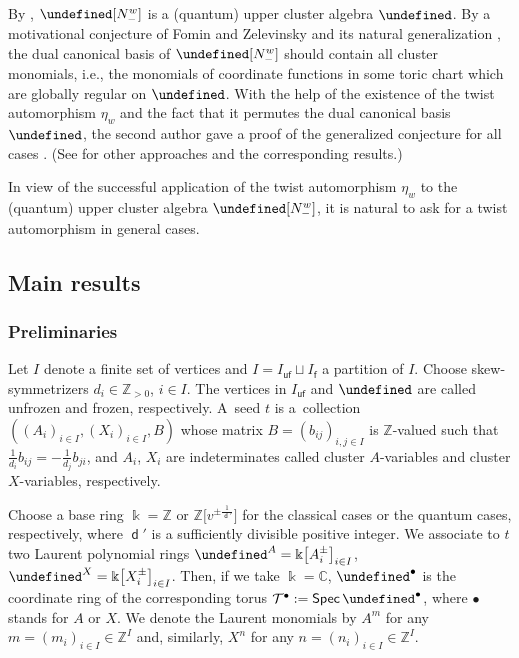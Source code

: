 \documentclass[10pt,a4paper]{amsart}
\newcommand{\kk}{\Bbbk}
\newcommand{\Z}{\mathbb{Z}}
\newcommand{\C}{\mathbb{C}}
\newcommand{\opname}[1]{\operatorname{\mathsf{#1}}}
\newcommand{\Spec}{\operatorname{\mathsf{Spec}}}
\newcommand{\cT}{{\mathcal T}}
\newcommand{\diag}{{\delta}}
\renewcommand{\diag}{{d}}
\newcommand{\fv}{\opname{f}}
\newcommand{\ufv}{\opname{uf}}
\let\dCan\undefined
\let\Ifv\undefined
\let\upClAlg\undefined
\let\AVar\undefined
\let\LP\undefined
\let\qO\undefined
\newcommand{\dCan}{\opname{B}^*}
\newcommand{\Ifv}{I_{\fv}}
\newcommand{\upClAlg}{\mathcal{U}^A}
\newcommand{\AVar}{\mathbb{A}}
\newcommand{\LP}{{\mathcal{LP}}}
\renewcommand{\diag}{\opname{d}'}
\newcommand{\qO}{{\opname{A_q}}}
\numberwithin{equation}{section}
\begin{document}
By \cite{GeissLeclercSchroeer10,GeissLeclercSchroeer11,GY13,goodearl2020integral},
$\qO[N_{-}^{w}]$ is a (quantum) upper cluster algebra $\upClAlg$.
By a motivational conjecture of Fomin and Zelevinsky \cite{FominZelevinsky02}
and its natural generalization \cite{Kimura10}, the dual canonical
basis of $\qO[N_{-}^{w}]$ should contain all cluster monomials, i.e.,
the monomials of coordinate functions in some toric chart which are globally regular
on $\AVar$. With the help of the existence of the twist automorphism
$\eta_{w}$ and the fact that it permutes the dual canonical basis
$\dCan$, the second author gave a proof of the generalized conjecture
for all cases \cite{qin2020dual}. (See \cite{Kang2018,mcnamara2021cluster,qin2017triangular} for other approaches
and the corresponding results.)

In view of the successful application of the twist automorphism $\eta_{w}$
to the (quantum) upper cluster algebra $\qO[N_{-}^{w}]$, it is natural
to ask for a twist automorphism in general cases.

\subsection{Main results}

\subsubsection*{Preliminaries}

Let $I$ denote a finite set of vertices and $I=I_{\ufv}\sqcup I_{\fv}$
a partition of $I$. Choose skew-symmetrizers $d_{i}\in\Z_{>0}$,
$i\in I$. The vertices in $I_{\ufv}$ and $\Ifv$ are called unfrozen
and frozen, respectively. A~seed $t$ is a~collection $((A_{i})_{i\in I},(X_{i})_{i\in I},B)$
whose matrix $B=(b_{ij})_{i,j\in I}$ is $\Z$-valued such that $\frac{1}{d_{i}}b_{ij}=-\frac{1}{d_{j}}b_{ji}$,
and $A_{i}$, $X_{i}$ are indeterminates called cluster $A$-variables
and cluster $X$-variables, respectively.

Choose a base ring $\kk=\Z\text{ or }\Z\big[v^{\pm\frac{1}{\diag}}\big]$ for the classical cases or the quantum cases, respectively, where $\diag$ is a sufficiently divisible positive integer. We associate to $t$ two Laurent polynomial rings $\LP^{A}=\kk\big[A_{i}^{\pm}\big]_{i\in I}$,
$\LP^{X}=\kk\big[X_{i}^{\pm}\big]_{i\in I}$. Then, if we take $\kk=\C$, $\LP^{\bullet}$ is the
coordinate ring of the corresponding torus $\cT^{\bullet}:=\Spec\LP^{\bullet}$,
where $\bullet$ stands for $A$ or $X$. We denote the Laurent monomials by
$A^{m}$ for any $m=(m_{i})_{i\in I}\in\Z^{I}$
and, similarly, $X^{n}$ for any $n=(n_{i})_{i\in I}\in\Z^{I}$.
\end{document}
